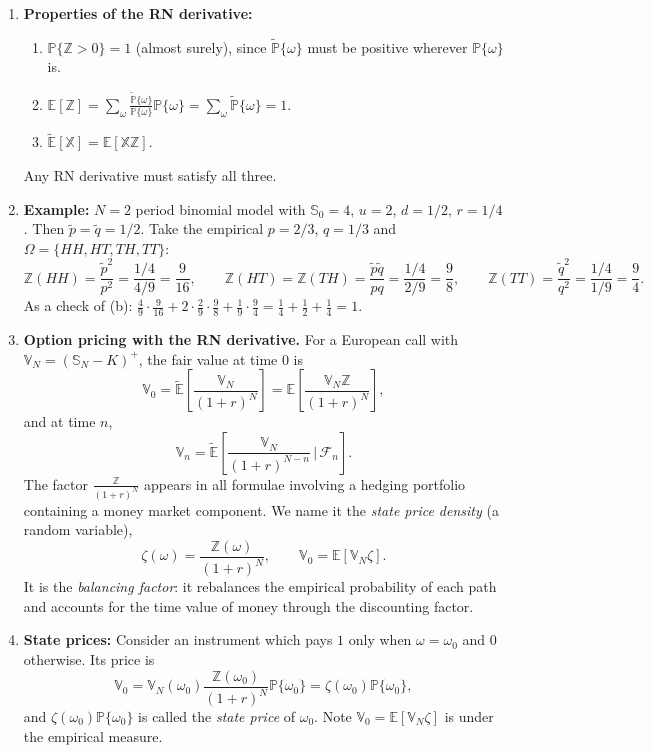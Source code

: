 \begin{enumerate}
    \item \textbf{Properties of the RN derivative:}
    \begin{enumerate}
        \item $\mathbb{P}\{\mathbb{Z} > 0\} = 1$ (almost surely), since $\tilde{\mathbb{P}}\{\omega\}$ must be positive wherever $\mathbb{P}\{\omega\}$ is.
        \item $\mathbb{E}[\mathbb{Z}] = \sum_\omega \frac{\tilde{\mathbb{P}}\{\omega\}}{\mathbb{P}\{\omega\}}\mathbb{P}\{\omega\} = \sum_\omega\tilde{\mathbb{P}}\{\omega\} = 1$.
        \item $\tilde{\mathbb{E}}[\mathbb{X}] = \mathbb{E}[\mathbb{X}\mathbb{Z}]$.
    \end{enumerate}
    Any RN derivative must satisfy all three.

    \item \textbf{Example:} $N = 2$ period binomial model with $\mathbb{S}_0 = 4$, $u = 2$, $d = 1/2$, $r = 1/4$. Then $\tilde{p} = \tilde{q} = 1/2$. Take the empirical $p = 2/3$, $q = 1/3$ and $\Omega = \{HH, HT, TH, TT\}$:
    \[\mathbb{Z}(HH) = \frac{\tilde{p}^2}{p^2} = \frac{1/4}{4/9} = \frac{9}{16}, \qquad \mathbb{Z}(HT) = \mathbb{Z}(TH) = \frac{\tilde{p}\tilde{q}}{pq} = \frac{1/4}{2/9} = \frac{9}{8}, \qquad \mathbb{Z}(TT) = \frac{\tilde{q}^2}{q^2} = \frac{1/4}{1/9} = \frac{9}{4}.\]
    As a check of (b): $\frac{4}{9}\cdot\frac{9}{16} + 2\cdot\frac{2}{9}\cdot\frac{9}{8} + \frac{1}{9}\cdot\frac{9}{4} = \frac{1}{4} + \frac{1}{2} + \frac{1}{4} = 1$.

    \item \textbf{Option pricing with the RN derivative.} For a European call with $\mathbb{V}_N = (\mathbb{S}_N - K)^+$, the fair value at time $0$ is
    \[\mathbb{V}_0 = \tilde{\mathbb{E}}\left[\frac{\mathbb{V}_N}{(1+r)^N}\right] = \mathbb{E}\left[\frac{\mathbb{V}_N\mathbb{Z}}{(1+r)^N}\right],\]
    and at time $n$,
    \[\mathbb{V}_n = \tilde{\mathbb{E}}\left[\frac{\mathbb{V}_N}{(1+r)^{N-n}}\,\Big|\, \mathcal{F}_n\right].\]
    The factor $\frac{\mathbb{Z}}{(1+r)^N}$ appears in all formulae involving a hedging portfolio containing a money market component. We name it the \textit{state price density} (a random variable),
    \[\zeta(\omega) = \frac{\mathbb{Z}(\omega)}{(1+r)^N}, \qquad \mathbb{V}_0 = \mathbb{E}[\mathbb{V}_N\zeta].\]
    It is the \textit{balancing factor}: it rebalances the empirical probability of each path and accounts for the time value of money through the discounting factor.

    \item \textbf{State prices:} Consider an instrument which pays $1$ only when $\omega = \omega_0$ and $0$ otherwise. Its price is
    \[\mathbb{V}_0 = \mathbb{V}_N(\omega_0)\frac{\mathbb{Z}(\omega_0)}{(1+r)^N}\mathbb{P}\{\omega_0\} = \zeta(\omega_0)\mathbb{P}\{\omega_0\},\]
    and $\zeta(\omega_0)\mathbb{P}\{\omega_0\}$ is called the \textit{state price} of $\omega_0$. Note $\mathbb{V}_0 = \mathbb{E}[\mathbb{V}_N\zeta]$ is under the empirical measure.


\end{enumerate}
